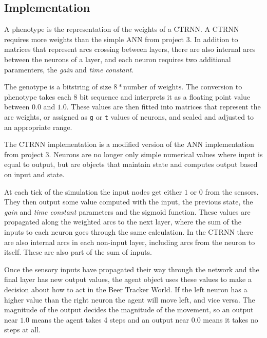 \documentclass[twoside]{article}
\begin{document}
\begin{multicols}{2} %

    \section{Implementation}
    A phenotype is the representation of the weights of a CTRNN.
    A CTRNN requires more weights than the simple ANN from project 3.
    In addition to matrices that represent arcs crossing between layers,
    there are also internal arcs between the neurons of a layer,
    and each neuron requires two additional paramenters, the \textit{gain} and \textit{time constant}.

    The genotype is a bitstring of size $8 * \text{number of weights}$.
    The conversion to phenotype takes each 8 bit sequence and interprets it as a floating point value between $0.0$ and $1.0$.
    These values are then fitted into matrices that represent the arc weights,
    or assigned as \texttt{g} or \texttt{t} values of neurons,
    and scaled and adjusted to an appropriate range.

    The CTRNN implementation is a modified version of the ANN implementation from project 3.
    Neurons are no longer only simple numerical values where input is equal to output,
    but are objects that maintain state and computes output based on input and state.

    At each tick of the simulation the input nodes get either $1$ or $0$ from the sensors.
    They then output some value computed with the input, the previous state, the \textit{gain} and \textit{time constant} parameters and the sigmoid function.
    These values are propagated along the weighted arcs to the next layer,
    where the sum of the inputs to each neuron goes through the same calculation.
    In the CTRNN there are also internal arcs in each non-input layer,
    including arcs from the neuron to itself.
    These are also part of the sum of inputs.

    Once the sensory inputs have propagated their way through the network and the final layer has new output values,
    the agent object uses these values to make a decision about how to act in the Beer Tracker World.
    If the left neuron has a higher value than the right neuron the agent will move left, and vice versa.
    The magnitude of the output decides the magnitude of the movement,
    so an output near $1.0$ means the agent takes 4 steps and an output near $0.0$ means it takes no steps at all.


\end{multicols}
\end{document}
